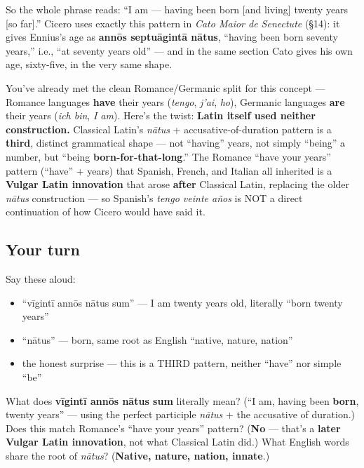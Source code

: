 So the whole phrase reads: \textquotedblleft{}I am — having been born {[}and living{]} twenty years {[}so far{]}.\textquotedblright{} Cicero uses exactly this pattern in \emph{Cato Maior de Senectute} (§14): it gives Ennius's age as \textbf{annōs septuāgintā nātus}, \textquotedblleft{}having been born seventy years,\textquotedblright{} i.e., \textquotedblleft{}at seventy years old\textquotedblright{} — and in the same section Cato gives his own age, sixty-five, in the very same shape.

\begin{culture}
You've already met the clean Romance/Germanic split for this concept — Romance languages \textbf{have} their years (\emph{tengo}, \emph{j'ai}, \emph{ho}), Germanic languages \textbf{are} their years (\emph{ich bin}, \emph{I am}). Here's the twist: \textbf{Latin itself used neither construction.} Classical Latin's \emph{nātus} + accusative-of-duration pattern is a \textbf{third}, distinct grammatical shape — not \textquotedblleft{}having\textquotedblright{} years, not simply \textquotedblleft{}being\textquotedblright{} a number, but \textquotedblleft{}being \textbf{born-for-that-long}.\textquotedblright{} The Romance \textquotedblleft{}have your years\textquotedblright{} pattern (\textquotedblleft{}have\textquotedblright{} + years) that Spanish, French, and Italian all inherited is a \textbf{Vulgar Latin innovation} that arose \textbf{after} Classical Latin, replacing the older \emph{nātus} construction — so Spanish's \emph{tengo veinte años} is NOT a direct continuation of how Cicero would have said it.
\end{culture}

\subsection*{Your turn}
Say these aloud:

\begin{itemize}
\raggedright
  \item \textquotedblleft{}vīgintī annōs nātus sum\textquotedblright{} — I am twenty years old, literally \textquotedblleft{}born twenty years\textquotedblright{}
  \item \textquotedblleft{}nātus\textquotedblright{} — born, same root as English \textquotedblleft{}native, nature, nation\textquotedblright{}
  \item the honest surprise — this is a THIRD pattern, neither \textquotedblleft{}have\textquotedblright{} nor simple \textquotedblleft{}be\textquotedblright{}
\end{itemize}

\begin{tcolorbox}[breakable,colback=teal!4,colframe=teal!35!black,title={Before you move on}]
What does \textbf{vīgintī annōs nātus sum} literally mean? (\textquotedblleft{}I am, having been \textbf{born}, twenty years\textquotedblright{} — using the perfect participle \emph{nātus} + the accusative of duration.) Does this match Romance's \textquotedblleft{}have your years\textquotedblright{} pattern? (\textbf{No} — that's a \textbf{later Vulgar Latin innovation}, not what Classical Latin did.) What English words share the root of \emph{nātus}? (\textbf{Native, nature, nation, innate}.)
\end{tcolorbox}
